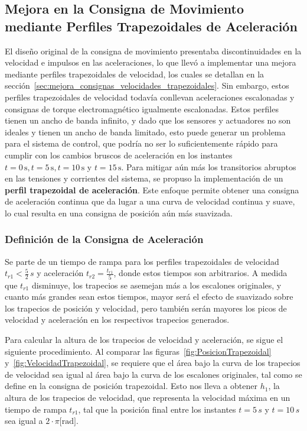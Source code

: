 \documentclass{article}
\begin{document}
\subsection{Mejora en la Consigna de Movimiento mediante Perfiles Trapezoidales de Aceleración}

El diseño original de la consigna de movimiento presentaba discontinuidades en la velocidad e impulsos en las aceleraciones, lo que llevó a implementar una mejora mediante perfiles trapezoidales de velocidad, los cuales se detallan en la sección~\ref{sec:mejora_consignas_velocidades_trapezoidales}. Sin embargo, estos perfiles trapezoidales de velocidad todavía conllevan aceleraciones escalonadas y consignas de torque electromagnético igualmente escalonadas. Estos perfiles tienen un ancho de banda infinito, y dado que los sensores y actuadores no son ideales y tienen un ancho de banda limitado, esto puede generar un problema para el sistema de control, que podría no ser lo suficientemente rápido para cumplir con los cambios bruscos de aceleración en los instantes \(t=0\,\text{s}, t=5\,\text{s}, t=10\,\text{s}\) y \(t=15\,\text{s}\). Para mitigar aún más los transitorios abruptos en las tensiones y corrientes del sistema, se propuso la implementación de un \textbf{perfil trapezoidal de aceleración}. Este enfoque permite obtener una consigna de aceleración continua que da lugar a una curva de velocidad continua y suave, lo cual resulta en una consigna de posición aún más suavizada.

\subsubsection{Definición de la Consigna de Aceleración}

Se parte de un tiempo de rampa para los perfiles trapezoidales de velocidad \(t_{r1} < \frac{5}{2}\,s\) y aceleración \(t_{r2} = \frac{t_{r1}}{5}\), donde estos tiempos son arbitrarios. A medida que \(t_{r1}\) disminuye, los trapecios se asemejan más a los escalones originales, y cuanto más grandes sean estos tiempos, mayor será el efecto de suavizado sobre los trapecios de posición y velocidad, pero también serán mayores los picos de velocidad y aceleración en los respectivos trapecios generados.

Para calcular la altura de los trapecios de velocidad y aceleración, se sigue el siguiente procedimiento. Al comparar las figuras~\ref{fig:PosicionTrapezoidal} y~\ref{fig:VelocidadTrapezoidal}, se requiere que el área bajo la curva de los trapecios de velocidad sea igual al área bajo la curva de los escalones originales, tal como se define en la consigna de posición trapezoidal. Esto nos lleva a obtener \(h_1\), la altura de los trapecios de velocidad, que representa la velocidad máxima en un tiempo de rampa \(t_{r1}\), tal que la posición final entre los instantes \(t = 5\,s\) y \(t = 10\,s\) sea igual a \(2\cdot \pi\text{[rad]}\).
\end{document}
